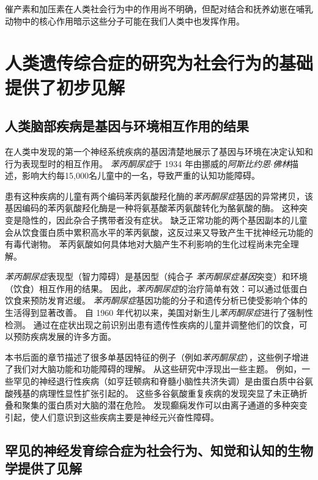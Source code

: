 催产素和加压素在人类社会行为中的作用尚不明确，但配对结合和抚养幼崽在哺乳动物中的核心作用暗示这些分子可能在我们人类中也发挥作用。



\section{人类遗传综合症的研究为社会行为的基础提供了初步见解}

\subsection{人类脑部疾病是基因与环境相互作用的结果}

在人类中发现的第一个神经系统疾病的基因清楚地展示了基因与环境在决定认知和行为表现型时的相互作用。
\textit{苯丙酮尿症}于 1934 年由挪威的\textit{阿斯比约恩$\cdot$佛林}描述，影响大约每15,000名儿童中的一名，导致严重的认知功能障碍。


患有这种疾病的儿童有两个编码苯丙氨酸羟化酶的\textit{苯丙酮尿症}基因的异常拷贝，该基因编码的苯丙氨酸羟化酶是一种将氨基酸苯丙氨酸转化为酪氨酸的酶。
这种突变是隐性的，因此杂合子携带者没有症状。
缺乏正常功能的两个基因副本的儿童会从饮食蛋白质中累积高水平的苯丙氨酸，这反过来又导致产生干扰神经元功能的有毒代谢物。
苯丙氨酸如何具体地对大脑产生不利影响的生化过程尚未完全理解。



\textit{苯丙酮尿症}表现型（智力障碍）是基因型（纯合子 \textit{苯丙酮尿症基因}突变）和环境（饮食）相互作用的结果。
因此，\textit{苯丙酮尿症}的治疗简单有效：可以通过低蛋白饮食来预防发育迟缓。
\textit{苯丙酮尿症}基因功能的分子和遗传分析已使受影响个体的生活得到显著改善。
自 1960 年代初以来，美国对新生儿\textit{苯丙酮尿症}进行了强制性检测。
通过在症状出现之前识别出患有遗传性疾病的儿童并调整他们的饮食，可以预防疾病发展的许多方面。



本书后面的章节描述了很多单基因特征的例子（例如\textit{苯丙酮尿症}），这些例子增进了我们对大脑功能和功能障碍的理解。
从这些研究中浮现出一些主题。
例如，一些罕见的神经退行性疾病（如亨廷顿病和脊髓小脑性共济失调）是由蛋白质中谷氨酸残基的病理性显性扩张引起的。
这些多谷氨酸重复疾病的发现突显了未正确折叠和聚集的蛋白质对大脑的潜在危险。
发现癫痫发作可以由离子通道的多种突变引起，使人们意识到这些疾病主要是神经元兴奋性障碍。



\subsection{罕见的神经发育综合症为社会行为、知觉和认知的生物学提供了见解}


